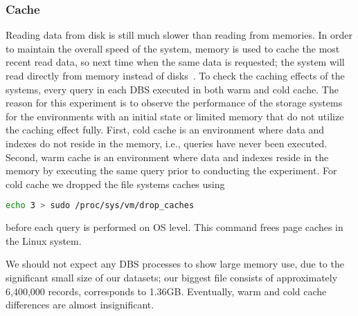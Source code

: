 \subsubsection{Cache}
\label{subsec:cache}
Reading data from disk is still much slower than reading from memories. In
order to maintain the overall speed of the system, memory is used to cache the most
recent read data, so next time when the same data is requested; the system will read
directly from memory instead of disks~\cite{Smit82}. 
To check the caching effects of the systems, every query in each DBS executed in both warm and cold cache. 
The reason for this experiment is to observe the performance of the storage systems for the environments 
with an initial state or limited memory that do not utilize the caching effect fully. 
First, cold cache is an environment where data and indexes do not reside in the memory, i.e., queries have
never been executed. 
Second, warm cache is an environment where data and indexes
reside in the memory by executing the same query prior to conducting the experiment. 
For cold cache we dropped the file systems caches using
\begin{lstlisting}[language=bash, caption= {UNIX Command for clean cache}, label={lst:paralDF}]
	echo 3 > sudo /proc/sys/vm/drop_caches
\end{lstlisting} 
before each query is performed on OS level. 
This command frees page caches in the Linux system. 

We should not expect any DBS processes to show large memory use, due to the significant small size of our datasets;
our biggest file consists of approximately 6,400,000 records, corresponds to 1.36GB. Eventually, 
warm and cold cache differences are almost insignificant. 



